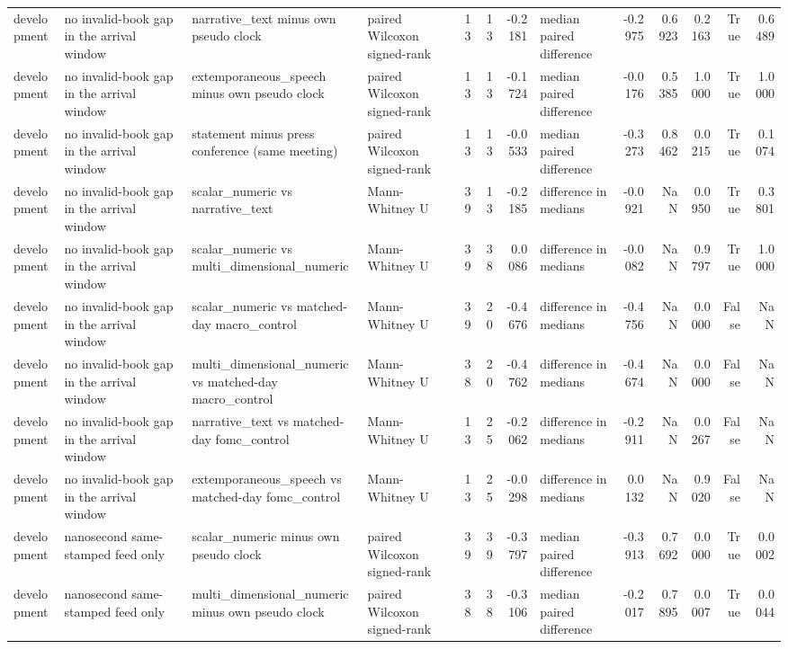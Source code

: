 \begin{tabular}{llllrrrlrrrrr}
development & no invalid-book gap in the arrival window & narrative_text minus own pseudo clock & paired Wilcoxon signed-rank & 13 & 13 & -0.2181 & median paired difference & -0.2975 & 0.6923 & 0.2163 & True & 0.6489 \\
development & no invalid-book gap in the arrival window & extemporaneous_speech minus own pseudo clock & paired Wilcoxon signed-rank & 13 & 13 & -0.1724 & median paired difference & -0.0176 & 0.5385 & 1.0000 & True & 1.0000 \\
development & no invalid-book gap in the arrival window & statement minus press conference (same meeting) & paired Wilcoxon signed-rank & 13 & 13 & -0.0533 & median paired difference & -0.3273 & 0.8462 & 0.0215 & True & 0.1074 \\
development & no invalid-book gap in the arrival window & scalar_numeric vs narrative_text & Mann-Whitney U & 39 & 13 & -0.2185 & difference in medians & -0.0921 & NaN & 0.0950 & True & 0.3801 \\
development & no invalid-book gap in the arrival window & scalar_numeric vs multi_dimensional_numeric & Mann-Whitney U & 39 & 38 & 0.0086 & difference in medians & -0.0082 & NaN & 0.9797 & True & 1.0000 \\
development & no invalid-book gap in the arrival window & scalar_numeric vs matched-day macro_control & Mann-Whitney U & 39 & 20 & -0.4676 & difference in medians & -0.4756 & NaN & 0.0000 & False & NaN \\
development & no invalid-book gap in the arrival window & multi_dimensional_numeric vs matched-day macro_control & Mann-Whitney U & 38 & 20 & -0.4762 & difference in medians & -0.4674 & NaN & 0.0000 & False & NaN \\
development & no invalid-book gap in the arrival window & narrative_text vs matched-day fomc_control & Mann-Whitney U & 13 & 25 & -0.2062 & difference in medians & -0.2911 & NaN & 0.0267 & False & NaN \\
development & no invalid-book gap in the arrival window & extemporaneous_speech vs matched-day fomc_control & Mann-Whitney U & 13 & 25 & -0.0298 & difference in medians & 0.0132 & NaN & 0.9020 & False & NaN \\
development & nanosecond same-stamped feed only & scalar_numeric minus own pseudo clock & paired Wilcoxon signed-rank & 39 & 39 & -0.3797 & median paired difference & -0.3913 & 0.7692 & 0.0000 & True & 0.0002 \\
development & nanosecond same-stamped feed only & multi_dimensional_numeric minus own pseudo clock & paired Wilcoxon signed-rank & 38 & 38 & -0.3106 & median paired difference & -0.2017 & 0.7895 & 0.0007 & True & 0.0044 \\

\end{tabular}
